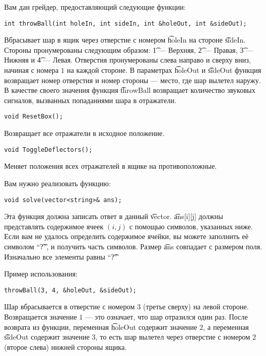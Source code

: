 Вам дан грейдер, предоставляющий следующие функции:

\begin{verbatim}
int throwBall(int holeIn, int sideIn, int &holeOut, int &sideOut);
\end{verbatim}

Вбрасывает шар в ящик через отверстие с номером \t{holeIn} на стороне \t{sideIn}. Стороны пронумерованы следующим образом: \t{1} --- Верхняя, \t{2} --- Правая, \t{3} --- Нижняя и \t{4} --- Левая. Отверстия пронумерованы слева направо и сверху вниз, начиная с номера $1$ на каждой стороне. В параметрах \t{holeOut} и \t{sideOut} функция возвращает номер отверстия и номер стороны --- место, где шар вылетел наружу. В качестве своего значения функция \t{throwBall} возвращает количество звуковых сигналов, вызванных попаданиями шара в отражатели.

\begin{verbatim}
void ResetBox();
\end{verbatim}

Возвращает все отражатели в исходное положение. 

\begin{verbatim}
void ToggleDeflectors();
\end{verbatim}

Меняет положения всех отражателей в ящике на противоположные. 

Вам нужно реализовать функцию:

\begin{verbatim}
void solve(vector<string>& ans);
\end{verbatim}

Эта функция должна записать ответ в данный \t{vector}. \t{ans[i][j]} должны представлять содержимое ячеек $(i, j)$ с помощью символов, указанных ниже. Если вам не удалось определить содержимое ячейки, вы можете заполнить её символом ``\t{?}'', и получить часть символов. Размер \t{ans} совпадает с размером поля. Изначально все элементы равны ``\t{?}''

Пример использования:

\begin{verbatim}
throwBall(3, 4, &holeOut, &sideOut);
\end{verbatim}

Шар вбрасывается в отверстие с номером $3$ (третье сверху) на левой стороне. Возвращается значение $1$ --- это означает, что шар отразился один раз. После возврата из функции, переменная \t{holeOut} содержит значение $2$, а переменная \t{sideOut} содержит значение $3$, то есть шар вылетел через отверстие с номером $2$ (второе слева) нижней стороны ящика. 

